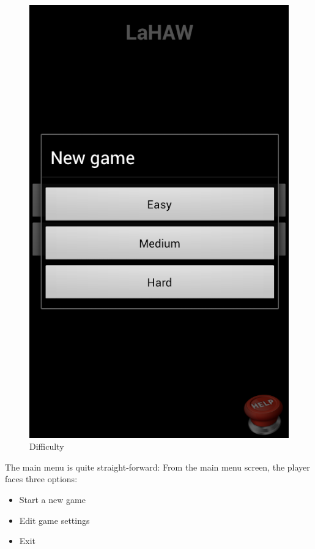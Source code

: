 \begin{figure}[ht]
\begin{minipage}[b]{0.325\linewidth}
		\includegraphics[scale=0.225]{img/Screenshot_difficulty.png}
		\caption{Difficulty}
		\label{fig:difficulty}
	\end{minipage}

\end{figure}

The main menu is quite straight-forward: From the main menu screen, the player faces three options: 
\noindent
\begin{itemize}
\item Start a new game
\item Edit game settings
\item Exit
\end{itemize}


